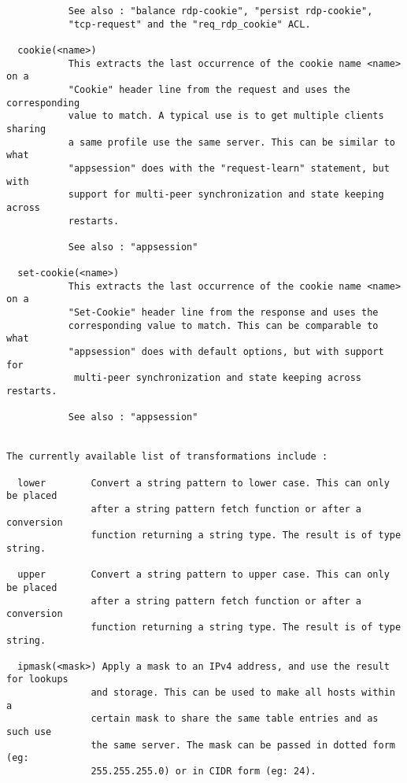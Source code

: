 \begin{verbatim}
	       See also : "balance rdp-cookie", "persist rdp-cookie",
	       "tcp-request" and the "req_rdp_cookie" ACL.

  cookie(<name>)
	       This extracts the last occurrence of the cookie name <name> on a
	       "Cookie" header line from the request and uses the corresponding
	       value to match. A typical use is to get multiple clients sharing
	       a same profile use the same server. This can be similar to what
	       "appsession" does with the "request-learn" statement, but with
	       support for multi-peer synchronization and state keeping across
	       restarts.

	       See also : "appsession"

  set-cookie(<name>)
	       This extracts the last occurrence of the cookie name <name> on a
	       "Set-Cookie" header line from the response and uses the
	       corresponding value to match. This can be comparable to what
	       "appsession" does with default options, but with support for
	        multi-peer synchronization and state keeping across restarts.

	       See also : "appsession"


The currently available list of transformations include :

  lower        Convert a string pattern to lower case. This can only be placed
               after a string pattern fetch function or after a conversion
               function returning a string type. The result is of type string.

  upper        Convert a string pattern to upper case. This can only be placed
               after a string pattern fetch function or after a conversion
               function returning a string type. The result is of type string.

  ipmask(<mask>) Apply a mask to an IPv4 address, and use the result for lookups
               and storage. This can be used to make all hosts within a
               certain mask to share the same table entries and as such use
               the same server. The mask can be passed in dotted form (eg:
               255.255.255.0) or in CIDR form (eg: 24).


\end{verbatim}
